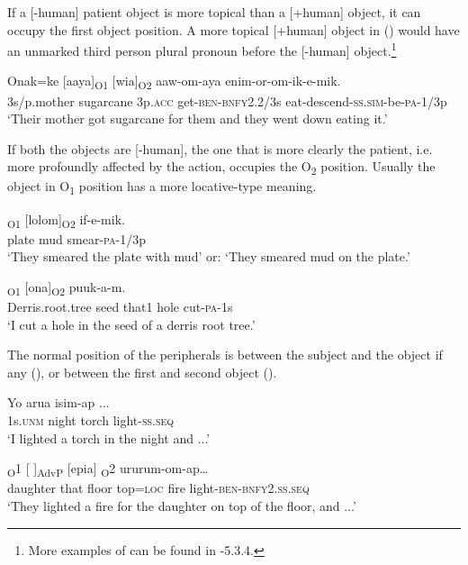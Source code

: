 If a [-human] patient object is more topical than a [+human] object, it can occupy the first object position. A more topical [+human] object in () would have an unmarked third person plural pronoun before the [-human] object.\footnote{More examples of can be found in -5.3.4.}

\ea%
\label{ex:x917}
\gll Onak=ke  [aaya]\textsubscript{O1}  [wia]\textsubscript{O2}  aaw-om-aya enim-or-om-ik-e-mik. \\
      3s/p.mother  sugarcane  3p.\textsc{acc}  get-\textsc{ben}-\textsc{bnfy}2.2/3s eat-descend-\textsc{ss}.\textsc{sim}-be-\textsc{pa}-1/3p \\
\glt `Their mother got sugarcane for them and they went down eating it.'
\z

If both the objects are [-human], the one that is more clearly the patient, i.e. more profoundly affected by the action, occupies the O\textsubscript{2} position. Usually the object in O\textsubscript{1} position has a more locative-type meaning.

\ea%
\label{ex:x927}
\gll [Epira]\textsubscript{O1}  [lolom]\textsubscript{O2}  if-e-mik. \\
      plate  mud  smear-\textsc{pa}-1/3p \\
\glt `They smeared the plate with mud' or: `They smeared mud on the plate.'
\z

\ea%
\label{ex:x934}
\textsubscript{O1}  [ona]\textsubscript{O2}  puuk-a-m. \\
     Derris.root.tree  seed  that1  hole  cut-\textsc{pa}-1s \\
\glt `I cut a hole in the seed of a derris root tree.'
\z

The normal position of the peripherals is between the subject and the object  if any (), or between the first and second object (). 

\ea%
\label{ex:x895}
\gll Yo    arua  isim-ap  ... \\
     1s.\textsc{unm}  night  torch  light-\textsc{ss}.\textsc{seq} \\
\glt `I lighted a torch in the night and ...'
\z

\ea%
\label{ex:x913}
\textsubscript{O}1  [ ]\textsubscript{AdvP}  [epia] \textsubscript{O}2 ururum-om-ap{\dots} \\
     daughter  that  floor  top=\textsc{loc}  fire light-\textsc{ben}-\textsc{bnfy}2.\textsc{ss}.\textsc{seq} \\
\glt `They lighted a fire for the daughter on top of the floor, and ...'
\z

